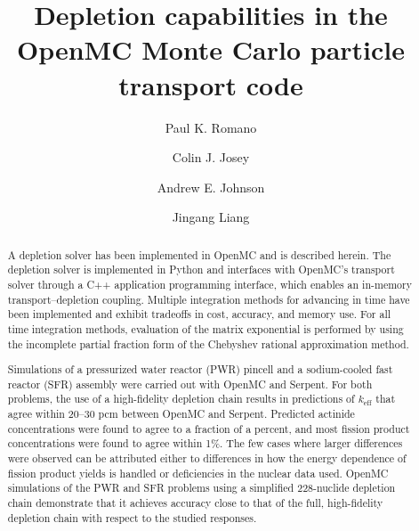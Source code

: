 \documentclass[3p,authoryear]{elsarticle}
\begin{document}
\title{Depletion capabilities in the OpenMC Monte Carlo particle transport code}

\author[anl]{Paul K. Romano}

\author[lanl]{Colin J. Josey}

\author[gatech]{Andrew E. Johnson}

\author[tsinghua]{Jingang Liang}

\address[anl]{Argonne National Laboratory, 9700 S. Cass Ave, Lemont, IL 60439, United States}
\address[lanl]{Los Alamos National Laboratory, P.O. Box 1663, Los Alamos, NM 87545, United States}
\address[gatech]{Georgia Institute of Technology, 770 State St. NW, Atlanta, GA 30318, United States}
\address[tsinghua]{Institute of Nuclear and New Energy Technology, Tsinghua University, Beijing, China}

\begin{abstract}
  A depletion solver has been implemented in OpenMC and is described herein. The
  depletion solver is implemented in Python and interfaces with OpenMC's
  transport solver through a C++ application programming interface, which
  enables an in-memory transport--depletion coupling. Multiple integration
  methods for advancing in time have been implemented and exhibit tradeoffs in
  cost, accuracy, and memory use. For all time integration methods, evaluation
  of the matrix exponential is performed by using the incomplete partial
  fraction form of the Chebyshev rational approximation method.

  Simulations of a pressurized water reactor (PWR) pincell and a sodium-cooled
  fast reactor (SFR) assembly were carried out with OpenMC and Serpent. For both
  problems, the use of a high-fidelity depletion chain results in predictions of
  $k_\text{eff}$ that agree within 20--30 pcm between OpenMC and Serpent.
  Predicted actinide concentrations were found to agree to a fraction of a
  percent, and most fission product concentrations were found to agree within
  1\%. The few cases where larger differences were observed can be attributed
  either to differences in how the energy dependence of fission product yields
  is handled or deficiencies in the nuclear data used. OpenMC simulations of the
  PWR and SFR problems using a simplified 228-nuclide depletion chain
  demonstrate that it achieves accuracy close to that of the full, high-fidelity
  depletion chain with respect to the studied responses.
\end{abstract}
\end{document}
